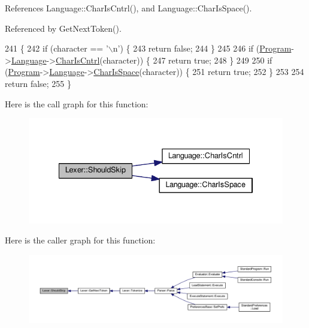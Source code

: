 References Language\+::\+Char\+Is\+Cntrl(), and Language\+::\+Char\+Is\+Space().



Referenced by Get\+Next\+Token().


\begin{DoxyCode}
241 \{
242     \textcolor{keywordflow}{if} (character == \textcolor{charliteral}{'\(\backslash\)n'}) \{
243         \textcolor{keywordflow}{return} \textcolor{keyword}{false};
244     \}
245 
246     \textcolor{keywordflow}{if} (\hyperlink{classProgram}{Program}->\hyperlink{classProgram_a7c82b4c429bbee984b8bb287b9e137f7}{Language}->\hyperlink{classLanguage_a392214aa8de840d1cf7b738945ce1799}{CharIsCntrl}(character)) \{
247         \textcolor{keywordflow}{return} \textcolor{keyword}{true};
248     \}
249 
250     \textcolor{keywordflow}{if} (\hyperlink{classProgram}{Program}->\hyperlink{classProgram_a7c82b4c429bbee984b8bb287b9e137f7}{Language}->\hyperlink{classLanguage_a1470832710ca9c4e4695bb442759c0a7}{CharIsSpace}(character)) \{
251         \textcolor{keywordflow}{return} \textcolor{keyword}{true};
252     \}
253 
254     \textcolor{keywordflow}{return} \textcolor{keyword}{false};
255 \}
\end{DoxyCode}


Here is the call graph for this function\+:\nopagebreak
\begin{figure}[H]
\begin{center}
\leavevmode
\includegraphics[width=334pt]{classLexer_a864c73023ef6b437a8d58c8158fbc6be_cgraph}
\end{center}
\end{figure}




Here is the caller graph for this function\+:\nopagebreak
\begin{figure}[H]
\begin{center}
\leavevmode
\includegraphics[width=350pt]{classLexer_a864c73023ef6b437a8d58c8158fbc6be_icgraph}
\end{center}
\end{figure}


